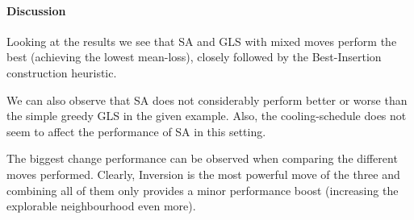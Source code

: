 \documentclass{paper}
\begin{document}
\begin{table}[!h]
\centering
\caption{Pairwise-Comparison}
\label{tab:pairComp}
\end{table}

\paragraph{Discussion}

Looking at the results we see that SA and GLS with mixed moves perform the best (achieving the lowest mean-loss), closely followed by the Best-Insertion construction heuristic. 

We can also observe that SA does not considerably perform better or worse than the simple greedy GLS in the given example. Also, the cooling-schedule does not seem to affect the performance of SA in this setting.

The biggest change performance can be observed when comparing the different moves performed. Clearly, Inversion is the most powerful move of the three and combining all of them only provides a minor performance boost (increasing the explorable neighbourhood even more).

 
\end{document}
